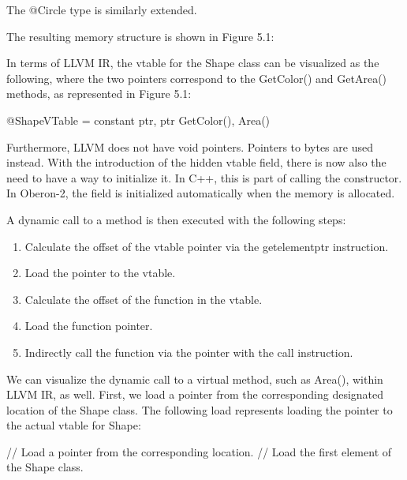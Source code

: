 The @Circle type is similarly extended.

The resulting memory structure is shown in Figure 5.1:


In terms of LLVM IR, the vtable for the Shape class can be visualized as the following, where the two pointers correspond to the GetColor() and GetArea() methods, as represented in Figure 5.1:

\begin{shell}
@ShapeVTable = constant { ptr, ptr } { GetColor(), Area() }
\end{shell}


Furthermore, LLVM does not have void pointers. Pointers to bytes are used instead. With the introduction of the hidden vtable field, there is now also the need to have a way to initialize it. In C++, this is part of calling the constructor. In Oberon-2, the field is initialized automatically when the memory is allocated.

A dynamic call to a method is then executed with the following steps:

\begin{enumerate}
\item
Calculate the offset of the vtable pointer via the getelementptr instruction.

\item
Load the pointer to the vtable.

\item
Calculate the offset of the function in the vtable.

\item
Load the function pointer.

\item
Indirectly call the function via the pointer with the call instruction.
\end{enumerate}

We can visualize the dynamic call to a virtual method, such as Area(), within LLVM IR, as well. First, we load a pointer from the corresponding designated location of the Shape class. The following load represents loading the pointer to the actual vtable for Shape:

\begin{shell}
// Load a pointer from the corresponding location.
// Load the first element of the Shape class.
\end{shell}

